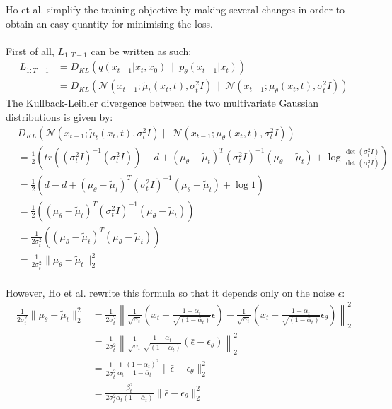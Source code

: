 \documentclass{article}
\begin{document}
Ho et al. \cite{ho2020denoising} simplify the training objective by making several changes in order to obtain an easy quantity for minimising the loss. 
\\\\
First of all, $L_{1: T-1}$ can be written as such:
\begin{align}
  L_{1:T-1} &= D_{KL}\left(q\left(x_{t-1} | x_t, x_0\right) \| \: p_{\theta}\left(x_{t-1} | x_t\right)\right) \\
  &= D_{KL}\left(\mathcal{N} (x_{t-1}; \tilde{\mu}_t \left(x_t, t \right), \sigma^2_t I ) \| \: \mathcal{N} \left( x_{t-1} ; \mu_{\theta}(x_t, t), \sigma^2_t I  \right) \right)
\end{align}
{
  \allowdisplaybreaks
  The Kullback-Leibler divergence between the two multivariate Gaussian distributions is given by:
  \begin{align}
    & D_{KL}\left(\mathcal{N} (x_{t-1}; \tilde{\mu}_t \left(x_t, t \right), \sigma^2_t I ) \| \: \mathcal{N} \left( x_{t-1} ; \mu_{\theta}(x_t, t), \sigma^2_t I  \right) \right) \\
    &= \frac{1}{2} \left( tr\left( (\sigma^2_t I)^{-1} (\sigma^2_t I) \right) - d + \left( \mu_{\theta} - \tilde{\mu}_t \right)^T (\sigma^2_t I)^{-1} \left( \mu_{\theta} - \tilde{\mu}_t \right) + \log \frac{\det(\sigma^2_t I)}{\det(\sigma^2_t I)} \right) \\
    &= \frac{1}{2} \left( d - d + \left( \mu_{\theta} - \tilde{\mu}_t \right)^T (\sigma^2_t I)^{-1} \left( \mu_{\theta} - \tilde{\mu}_t \right) + \log 1 \right) \\
    &= \frac{1}{2} \left( \left( \mu_{\theta} - \tilde{\mu}_t \right)^T (\sigma^2_t I)^{-1} \left( \mu_{\theta} - \tilde{\mu}_t \right) \right) \\
    &= \frac{1}{2 \sigma^2_t} \left( \left( \mu_{\theta} - \tilde{\mu}_t \right)^T \left( \mu_{\theta} - \tilde{\mu}_t \right) \right) \\
    &= \frac{1}{2 \sigma^2_t} \| \mu_{\theta} - \tilde{\mu}_t \|_2^2
  \end{align}
  \\
  However, Ho et al. \cite{ho2020denoising} rewrite this formula so that it depends only on the noise $\epsilon$:
  \begin{align}
    \frac{1}{2 \sigma^2_t} \| \mu_{\theta} - \tilde{\mu}_t \|_2^2 &= \frac{1}{2 \sigma^2_t} \left\| \frac{1}{\sqrt{\alpha_t}} \left( x_t - \frac{1 - \alpha_t}{\sqrt{(1 - \bar{\alpha}_t)}} \bar{\epsilon} \right) - \frac{1}{\sqrt{\alpha_t}} \left( x_t - \frac{1 - \alpha_t}{\sqrt{(1 - \bar{\alpha}_t)}} \epsilon_\theta \right)\right\|_2^2 \\
    &= \frac{1}{2 \sigma^2_t} \left\| \frac{1}{\sqrt{\alpha_t}} \frac{1 - \alpha_t}{\sqrt{(1 - \bar{\alpha}_t)}} (\bar{\epsilon} - \epsilon_\theta) \right\|_2^2 \\
    &= \frac{1}{2 \sigma^2_t} \frac{1}{\alpha_t} \frac{(1 - \alpha_t)^2}{1 - \bar{\alpha}_t} \| \bar{\epsilon} - \epsilon_\theta \|_2^2 \\
    &= \frac{\beta_t^2}{2 \sigma^2_t \alpha_t (1 - \bar{\alpha}_t)} \| \bar{\epsilon} - \epsilon_\theta \|_2^2
  \end{align}
}
\end{document}
